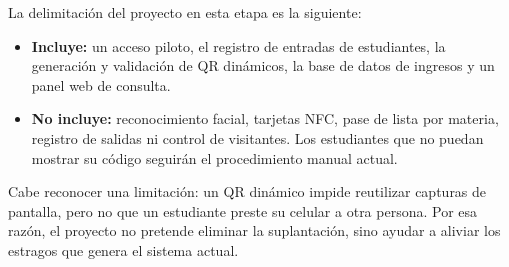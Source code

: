 La delimitación del proyecto en esta etapa es la siguiente:
\begin{itemize}
	\item \textbf{Incluye:} un acceso piloto, el registro de entradas de
	      estudiantes, la generación y validación de QR dinámicos, la base de datos de
	      ingresos y un panel web de consulta.
	\item \textbf{No incluye:} reconocimiento facial, tarjetas NFC, pase de lista
	      por materia, registro de salidas ni control de visitantes. Los estudiantes
	      que no puedan mostrar su código seguirán el procedimiento manual actual.
\end{itemize}

Cabe reconocer una limitación: un QR dinámico impide reutilizar capturas de
pantalla, pero no que un estudiante preste su celular a otra persona. Por esa
razón, el proyecto no pretende eliminar la suplantación, sino ayudar a
aliviar los estragos que genera el sistema actual.
